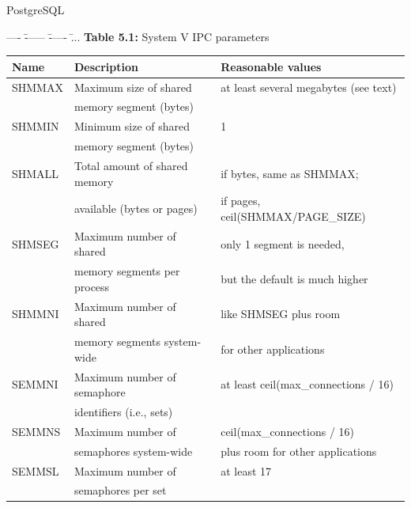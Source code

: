 \documentclass[xcolor=dvipsnames]{beamer}
\begin{document}
	\begin{frame}{PostgreSQL}
	\tiny
	{	 
	\begin{tabbing}
		---- \= ------ \= ----- \= ... \kill
		\textbf{Table 5.1:} System V IPC parameters
	\end{tabbing}
	\begin{center}
	\begin{tabular}{| l | l | l | }
		\hline
	    Name		& Description					& Reasonable values 						\\ \hline
	    
	    SHMMAX		& Maximum size of shared 		& at least several megabytes (see text)		\\
	    			& memory segment (bytes)  		&											\\ \hline
	    
	    SHMMIN		& Minimum size of shared 		& 1											\\
	    			& memory segment (bytes) 		&  											\\ \hline

		SHMALL 		& Total amount of shared memory	& if bytes, same as SHMMAX;					\\
					& available (bytes or pages) 	& if pages, ceil(SHMMAX/PAGE\_SIZE)			\\ \hline	
		
		SHMSEG 		& Maximum number of shared 		& only 1 segment is needed, 				\\
					& memory segments per process 	& but the default is much higher			\\ \hline

		SHMMNI		& Maximum number of shared 		& like SHMSEG plus room 					\\
					& memory segments system-wide 	& for other applications					\\ \hline

		SEMMNI 		& Maximum number of semaphore 	& at least ceil(max\_connections / 16)		\\ 
		       		& identifiers (i.e., sets) 		&											\\ \hline

		SEMMNS 		& Maximum number of      		& ceil(max\_connections / 16) \* 17 		\\
			   		& semaphores system-wide 		& plus room for other applications			\\ \hline
		
		SEMMSL 		& Maximum number of				& at least 17								\\
					& semaphores per set  			& 											\\ \hline


\end{tabular}
\end{center}}
\end{frame}
\end{document}
